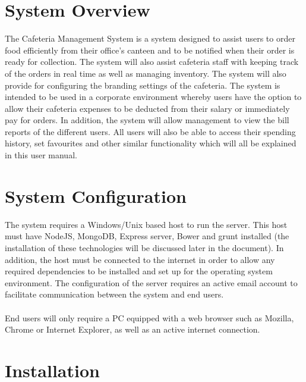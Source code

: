 \documentclass[a4paper,12pt]{article}
\begin{document}
\section{System Overview}
The Cafeteria Management System is a system designed to assist users to order food efficiently from their office's canteen and to be notified when their order is ready for collection. The system will also assist cafeteria staff with keeping track of the orders in real time as well as managing inventory. The system will also provide for configuring the branding settings of the cafeteria. The system is intended to be used in a corporate environment whereby users have the option to allow their cafeteria expenses to be deducted from their salary or immediately pay for orders. In addition, the system will allow management to view the bill reports of the different users. All users will also be able to access their spending history, set favourites and other similar functionality which will all be explained in this user manual. \\

\section{System Configuration}
The system requires a Windows/Unix based host to run the server. This host must have NodeJS, MongoDB, Express server, Bower and grunt  installed (the installation of these technologies will be discussed later in the document). In addition, the host must be connected to the internet in order to allow any required dependencies to be installed and set up for the operating system environment. The configuration of the server requires an active email account to facilitate communication between the system and end users. \\ 
\\
End users will only require a PC equipped with a web browser such as Mozilla, Chrome or Internet Explorer, as well as an active internet connection.

\section{Installation}
\end{document}
